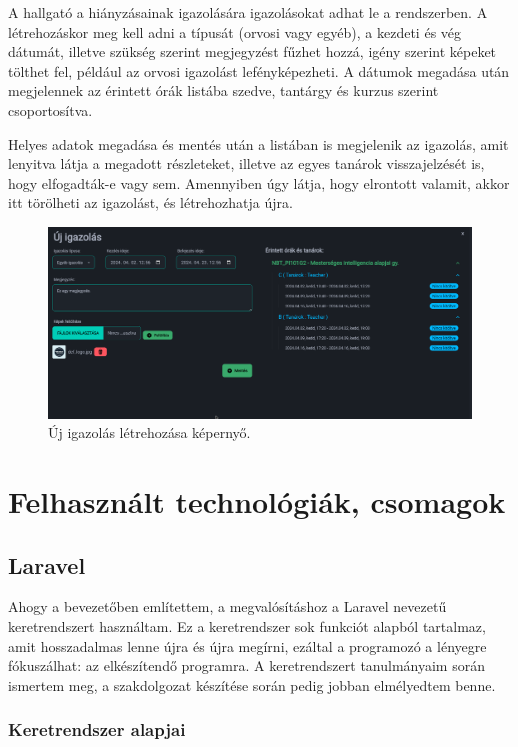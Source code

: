 \documentclass[
]{thesis-ekf}
\theoremstyle{definition}
\theoremstyle{remark}
\begin{document}
A hallgató a hiányzásainak igazolására igazolásokat adhat le a rendszerben. A létrehozáskor meg kell adni a típusát (orvosi vagy egyéb), a kezdeti és vég dátumát, illetve szükség szerint megjegyzést fűzhet hozzá, igény szerint képeket tölthet fel, például az orvosi igazolást lefényképezheti. A dátumok megadása után megjelennek az érintett órák listába szedve, tantárgy és kurzus szerint csoportosítva.

Helyes adatok megadása és mentés után a listában is megjelenik az igazolás, amit lenyitva látja a megadott részleteket, illetve az egyes tanárok visszajelzését is, hogy elfogadták-e vagy sem. Amennyiben úgy látja, hogy elrontott valamit, akkor itt törölheti az igazolást, és létrehozhatja újra.

\begin{figure}[ht!]
	\centering
	\includegraphics[width=15cm]{../pictures/screenshots/newJust.png}
	\caption{Új igazolás létrehozása képernyő.}
	\label{studentJustification}
\end{figure}

\chapter{Felhasznált technológiák, csomagok}
\label{packages}
\section{Laravel}

Ahogy a bevezetőben említettem, a megvalósításhoz a Laravel nevezetű keretrendszert használtam. Ez a keretrendszer sok funkciót alapból tartalmaz, amit hosszadalmas lenne újra és újra megírni, ezáltal a programozó a lényegre fókuszálhat: az elkészítendő programra.\cite{meetlaravel} A keretrendszert tanulmányaim során ismertem meg, a szakdolgozat készítése során pedig jobban elmélyedtem benne.

\subsection{Keretrendszer alapjai}
\end{document}
